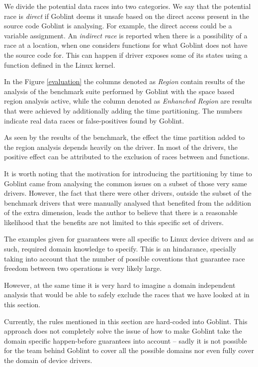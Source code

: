\documentclass[..thesis.tex]{subfiles}
\begin{document}
We divide the potential data races into two categories. We say that the potential race is \textit{direct} if Goblint deems it unsafe based on the direct access present in the source code
Goblint is analysing. For example, the direct access could be a variable assignment.
An \textit{indirect race} is reported when there is a possibility of a race at a location, when one considers functions for what Goblint does not have the source code for.
This can happen if driver exposes some of its states using a function defined in the Linux kernel.   

In the Figure \ref{evaluation} the columns denoted as \textit{Region} contain results of the analysis of the benchmark suite performed by Goblint with the space based region analysis active, while the column denoted as \textit{Enhanched Region} are results that were achieved by additionally adding the time partitioning. The numbers indicate real data races or false-positives found by Goblint.

As seen by the results of the benchmark, the effect the time partition added to the region analysis depends heavily on the driver.
In most of the drivers, the positive effect can be attributed to the exclusion of races between  and  functions. 

It is worth noting that the motivation for introducing the partitioning by time to Goblint came from analysing the common issues on a subset of those very same drivers.
However, the fact that there were other drivers, outside the subset of the benchmark drivers that were manually analysed
that benefited from the addition of the extra dimension, leads the author to believe that there is a reasonable likelihood
that the benefits are not limited to this specific set of drivers.


The examples given for guarantees were all specific to Linux device drivers and as such, required domain knowledge to specify. This is an hindarance,
specially taking into account that the number of possible coventions that guarantee race freedom between two operations is very likely large.  

However, at the same time it is very hard to imagine a domain independent analysis that would be able to safely exclude the races that we have looked at in this section.

Currently, the rules mentioned in this section are hard-coded into Goblint. This approach does not completely solve the issue of how to make Goblint take the domain specific happen-before
guarantees into account -- sadly it is not possible for the team behind Goblint to cover all the possible domains nor even fully cover the domain of device drivers.
\end{document}
